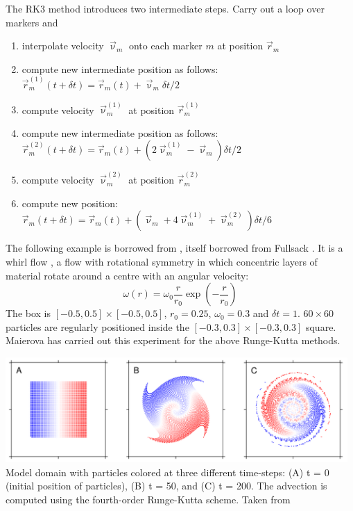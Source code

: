 The RK3 method introduces two intermediate steps. Carry out a loop over markers and 
\begin{enumerate}
\item interpolate velocity $\vec\upnu_{m}$ onto each marker $m$ at position $\vec r_m$
\item compute new intermediate position as follows: $\vec r_m^{(1)}(t+\delta t)=\vec r_m(t) + \vec\upnu_m \delta t/2$
\item compute velocity $\vec\upnu_{m}^{(1)}$ at position $\vec r_m^{(1)}$
\item compute new intermediate position as follows: 
$\vec r_m^{(2)}(t+\delta t)=\vec r_m(t) + (2\vec\upnu_m^{(1)}-\vec\upnu_m) \delta t/2$
\item compute velocity $\vec\upnu_{m}^{(2)}$ at position $\vec r_m^{(2)}$
\item compute new position: 
$\vec r_m(t+\delta t)=\vec r_m(t) + (\vec\upnu_m +4 \vec\upnu_m^{(1)} + \vec\upnu_m^{(2)}    )\delta t/6$ 
\end{enumerate}

The following example is borrowed from \cite{maie12}, itself borrowed from Fullsack \cite[Section 5.4]{full95}.
It is a whirl flow \cite{otti89}, a flow with rotational symmetry in which concentric layers of material
rotate around  a centre with an angular velocity:
\[
\omega(r)= \omega_0 \frac{r}{r_0} \exp\left(-\frac{r}{r_0}  \right)
\]  
The box is $[-0.5,0.5]\times[-0.5,0.5]$, $r_0=0.25$, $\omega_0=0.3$ and $\delta t=1$. 
$60\times 60$ particles are regularly positioned inside the $[-0.3,0.3]\times[-0.3,0.3]$ square.
Maierova \cite{maie12} has carried out this experiment for the above Runge-Kutta methods.

\begin{center}
\includegraphics[height=4cm]{images/rk/maie12a}\\
{\captionfont Model domain with particles colored at three
different time-steps: (A) t = 0 (initial position of particles), (B) t = 50, and (C) t = 200.
The advection is computed using the fourth-order Runge-Kutta scheme. Taken from \cite{maie12}}
\end{center}

